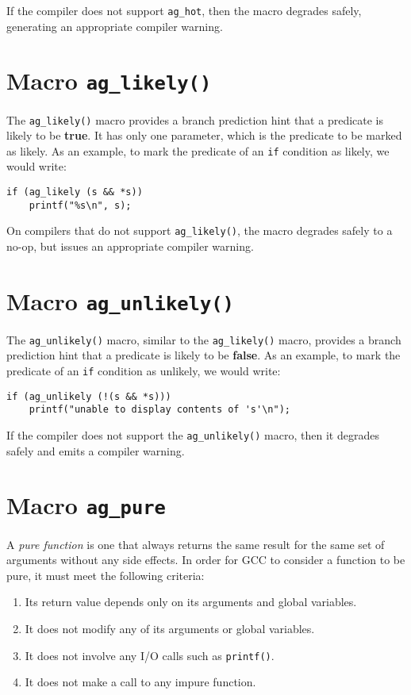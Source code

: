 If the compiler does not support \texttt{ag\_hot}, then the macro degrades
safely, generating an appropriate compiler warning.

\section{Macro \texttt{ag\_likely()}}
The \verb|ag_likely()| macro provides a branch prediction hint that a predicate
is likely to be \textbf{true}. It has only one parameter, which is the predicate 
to be marked as likely. As an example, to mark the predicate of an \verb|if| 
condition as likely, we would write:
\begin{lstlisting}[linewidth=1.0\linewidth]
if (ag_likely (s && *s)) 
    printf("%s\n", s);
\end{lstlisting}

On compilers that do not support \verb|ag_likely()|, the macro degrades safely
to a no-op, but issues an appropriate compiler warning.

\section{Macro \texttt{ag\_unlikely()}}
The \verb|ag_unlikely()| macro, similar to the \verb|ag_likely()| macro,
provides a branch prediction hint that a predicate is likely to be 
\textbf{false}. As an example, to mark the predicate of an \verb|if| condition 
as unlikely, we would write:
\begin{lstlisting}[linewidth=1.0\linewidth]
if (ag_unlikely (!(s && *s))) 
    printf("unable to display contents of 's'\n");
\end{lstlisting}

If the compiler does not support the \verb|ag_unlikely()| macro, then it
degrades safely and emits a compiler warning.

\section{Macro \texttt{ag\_pure}}
A \emph{pure function} is one that always returns the same result for the same
set of arguments without any side effects. In order for GCC to consider a
function to be pure, it must meet the following criteria:
\begin{enumerate}
  \item Its return value depends only on its arguments and global variables.
  \item It does not modify any of its arguments or global variables.
  \item It does not involve any I/O calls such as \texttt{printf()}.
  \item It does not make a call to any impure function.
\end{enumerate}

